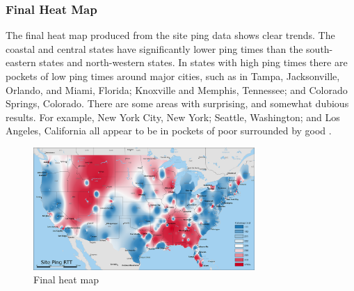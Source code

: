 \subsubsection{Final Heat Map}
The final heat map produced from the site ping data shows clear trends. The coastal and central states have significantly lower ping times than the south-eastern states and north-western states. In states with high ping times there are pockets of low ping times around major cities, such as in  Tampa, Jacksonville, Orlando, and Miami, Florida; Knoxville and Memphis, Tennessee; and Colorado Springs, Colorado. There are some areas with surprising, and somewhat dubious results. For example, New York City, New York; Seattle, Washington; and Los Angeles, California all appear to be in pockets of poor \rtt surrounded by good \rtt.


\begin{figure}[htb]
    \centering
    \includegraphics[width=0.75\textwidth]{images/siteping/site_ping_rtt_idw.png}
    \caption{Final heat map} %
    \label{fig:siteping_heatmap}
\end{figure}
